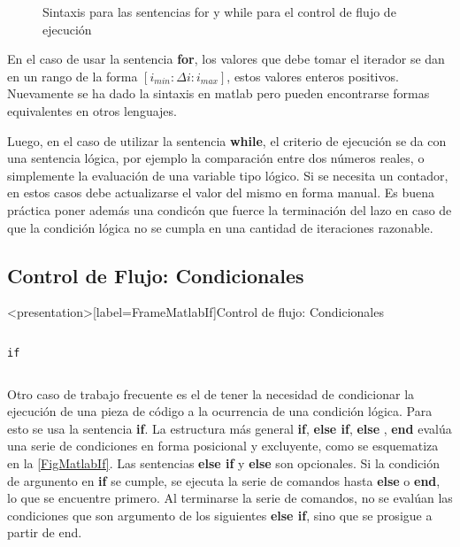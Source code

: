 \begin{figure}
  \caption{
    Sintaxis para las sentencias for y while
  para el control de flujo de ejecución \label{FigMatlabForWhile}
}
\end{figure}

En el caso de usar la sentencia \textbf{for}, los valores que debe tomar
el iterador se dan en un rango de la forma  $[ i_{min} :  \Delta i : i_{max} ]$, 
estos valores enteros positivos. Nuevamente se ha dado la sintaxis en matlab
pero pueden encontrarse formas equivalentes en otros lenguajes. 

Luego, en el caso de utilizar la sentencia \textbf{while}, el criterio 
de ejecución se da con una sentencia lógica, por ejemplo la comparación
entre dos números reales, o simplemente la evaluación de una 
variable tipo lógico. Si se necesita un contador, en estos casos
debe actualizarse el valor del mismo en forma manual. Es buena
práctica poner además una condicón que fuerce la terminación  
del lazo en caso de que la condición lógica no se cumpla 
en una cantidad de iteraciones razonable. 

\mode*

\subsection{Control de Flujo: Condicionales}

\begin{frame}<presentation>[label=FrameMatlabIf]{Control de flujo: Condicionales} 
\begin{columns}[T]
\hfill \large\texttt{if}

\begin{codeblock}

\end{codeblock}

\begin{codeblock}

\end{codeblock}

\end{columns}
\end{frame}


Otro caso de trabajo frecuente es el de tener 
la necesidad de condicionar la ejecución de 
una pieza de código a la ocurrencia de una 
condición lógica. Para esto se usa la sentencia
\textbf{if}. La estructura más general \textbf{if},
\textbf{else if}, \textbf{else} , \textbf{end} evalúa
una serie de condiciones en forma posicional  y 
excluyente, como se esquematiza en la 
\autoref{FigMatlabIf}. Las sentencias \textbf{else if} y 
\textbf{else} son opcionales. Si la condición 
de argunento en \textbf{if} se cumple, se ejecuta
la serie de comandos hasta \textbf{else} o 
\textbf{end}, lo que se encuentre primero. Al 
terminarse la serie de comandos, no se evalúan 
las condiciones que son argumento de los 
siguientes \textbf{else if}, sino que se
prosigue a partir de end. 

